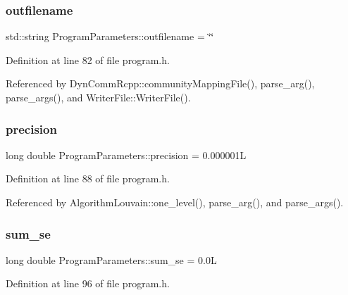 \subsubsection{\texorpdfstring{outfilename}{outfilename}}
{\footnotesize\ttfamily std\+::string Program\+Parameters\+::outfilename = \char`\"{}\char`\"{}}



Definition at line 82 of file program.\+h.



Referenced by Dyn\+Comm\+Rcpp\+::community\+Mapping\+File(), parse\+\_\+arg(), parse\+\_\+args(), and Writer\+File\+::\+Writer\+File().

\mbox{\label{structProgramParameters_a11962f1fb0a7954aa5459b6d3a038b32}} 
\subsubsection{\texorpdfstring{precision}{precision}}
{\footnotesize\ttfamily long double Program\+Parameters\+::precision = 0.\+000001L}



Definition at line 88 of file program.\+h.



Referenced by Algorithm\+Louvain\+::one\+\_\+level(), parse\+\_\+arg(), and parse\+\_\+args().

\mbox{\label{structProgramParameters_aa1eb9e78cc416055fb0e4a34d06a9e92}} 
\subsubsection{\texorpdfstring{sum\+\_\+se}{sum\_se}}
{\footnotesize\ttfamily long double Program\+Parameters\+::sum\+\_\+se = 0.\+0L}



Definition at line 96 of file program.\+h.

\mbox{\label{structProgramParameters_a94e83f064575a4e4974b08d6e77b7d11}} 
